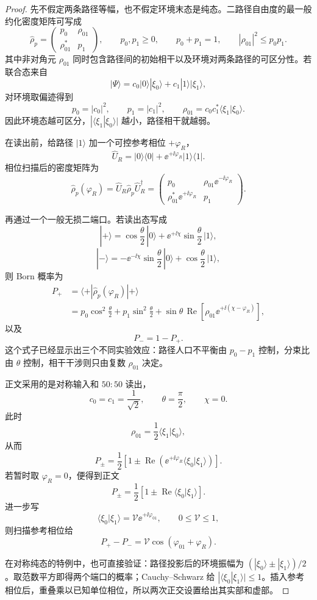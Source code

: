 \begin{proof}
先不假定两条路径等幅，也不假定环境末态是纯态。二路径自由度的最一般约化密度矩阵可写成
\[
\hat\rho_p
=
\begin{pmatrix}
p_0 & \rho_{01}\\
\rho_{01}^* & p_1
\end{pmatrix},
\qquad
p_0,p_1\ge0,
\qquad
p_0+p_1=1,
\qquad
|\rho_{01}|^2\le p_0p_1.
\]
其中非对角元 $\rho_{01}$ 同时包含路径间的初始相干以及环境对两条路径的可区分性。若联合态来自
\[
|\Psi\rangle
=
c_0|0\rangle|\xi_0\rangle
+
c_1|1\rangle|\xi_1\rangle,
\]
对环境取偏迹得到
\[
p_0=|c_0|^2,
\qquad
p_1=|c_1|^2,
\qquad
\rho_{01}
=
c_0c_1^*
\langle\xi_1|\xi_0\rangle.
\]
因此环境态越可区分，$|\langle\xi_1|\xi_0\rangle|$ 越小，路径相干就越弱。

在读出前，给路径 $|1\rangle$ 加一个可控参考相位 $+\varphi_R$，
\[
\hat U_R
=
|0\rangle\langle0|
+
\ee^{+\ii\varphi_R}|1\rangle\langle1|.
\]
相位扫描后的密度矩阵为
\[
\hat\rho_p(\varphi_R)
=
\hat U_R\hat\rho_p\hat U_R^\dagger
=
\begin{pmatrix}
p_0 & \rho_{01}\ee^{-\ii\varphi_R}\\
\rho_{01}^*\ee^{+\ii\varphi_R} & p_1
\end{pmatrix}.
\]

再通过一个一般无损二端口。若读出态写成
\[
|+\rangle
=
\cos\frac\theta2\,|0\rangle
+
\ee^{+\ii\chi}
\sin\frac\theta2\,|1\rangle,
\]
\[
|-\rangle
=
-\ee^{-\ii\chi}
\sin\frac\theta2\,|0\rangle
+
\cos\frac\theta2\,|1\rangle,
\]
则 Born 概率为
\begin{align*}
P_+
&=
\langle+|\hat\rho_p(\varphi_R)|+\rangle\\
&=
p_0\cos^2\frac\theta2
+
p_1\sin^2\frac\theta2
+
\sin\theta\,
\operatorname{Re}
\!\left[
\rho_{01}
\ee^{+\ii(\chi-\varphi_R)}
\right],
\end{align*}
以及
\[
P_-=1-P_+.
\]
这个式子已经显示出三个不同实验效应：路径人口不平衡由 $p_0-p_1$ 控制，分束比由 $\theta$ 控制，相干干涉则只由复数 $\rho_{01}$ 决定。

正文采用的是对称输入和 $50{:}50$ 读出，
\[
c_0=c_1=\frac1{\sqrt2},
\qquad
\theta=\frac\pi2,
\qquad
\chi=0.
\]
此时
\[
\rho_{01}
=
\frac12\langle\xi_1|\xi_0\rangle,
\]
从而
\[
P_\pm
=
\frac12
\left[
1
\pm
\operatorname{Re}
\!\left(
\ee^{+\ii\varphi_R}
\langle\xi_0|\xi_1\rangle
\right)
\right].
\]
若暂时取 $\varphi_R=0$，便得到正文
\[
\boxed{
P_\pm
=
\frac12
\left[
1\pm
\operatorname{Re}
\langle\xi_0|\xi_1\rangle
\right].
}
\]
进一步写
\[
\langle\xi_0|\xi_1\rangle
=
\mathcal V\ee^{+\ii\varphi_{01}},
\qquad
0\le\mathcal V\le1,
\]
则扫描参考相位给
\[
P_+-P_-
=
\mathcal V
\cos(\varphi_{01}+\varphi_R).
\]


在对称纯态的特例中，也可直接验证：路径投影后的环境振幅为 $(|\xi_0\rangle\pm|\xi_1\rangle)/2$。取范数平方即得两个端口的概率；Cauchy--Schwarz 给 $|\langle\xi_0|\xi_1\rangle|\le1$。插入参考相位后，重叠乘以已知单位相位，所以两次正交设置给出其实部和虚部。
\end{proof}

